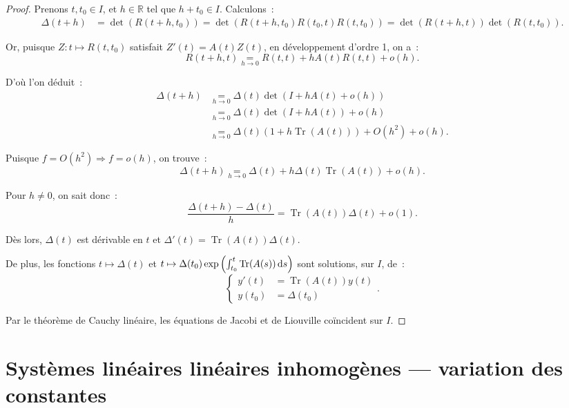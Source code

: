 \documentclass{report}
\theoremstyle{definition}
\theoremstyle{remark}
\numberwithin{equation}{section}
\newcommand{\R}{\mathbb R}
\DeclareMathOperator{\Tr}{Tr}
\begin{document}
		\begin{proof} Prenons $t, t_0 \in I$, et $h \in \R$ tel que $h + t_0 \in I$. Calculons~:
		\begin{align}
			\Delta(t+h) &= \det(R(t+h, t_0)) = \det(R(t+h, t_0)R(t_0, t)R(t, t_0)) = \det(R(t+h, t))\det(R(t, t_0)).
		\end{align}

		Or, puisque $Z : t \mapsto R(t, t_0)$ satisfait $Z'(t) = A(t)Z(t)$, en développement d'ordre 1, on a~:
		\begin{equation}
			R(t+h, t) \underset{h \to 0}= R(t, t) + hA(t)R(t, t) + o(h).
		\end{equation}

		D'où l'on déduit~:
		\begin{align}
			\Delta(t+h) &\underset{h \to 0}= \Delta(t)\det(I + hA(t) + o(h)) \\
			&\underset{h \to 0}= \Delta(t)\det(I + hA(t)) + o(h) \\
			&\underset{h \to 0}= \Delta(t)\left(1 + h\Tr(A(t))\right) + O(h^2) + o(h).
		\end{align}

		Puisque $f = O(h^2) \Rightarrow f = o(h)$, on trouve~:
		\begin{equation}
			\Delta(t+h) \underset{h \to 0}= \Delta(t) + h\Delta(t)\Tr(A(t)) + o(h).
		\end{equation}

		Pour $h \neq 0$, on sait donc~:
		\begin{equation}
			\frac {\Delta(t+h)-\Delta(t)}h = \Tr(A(t))\Delta(t) + o(1).
		\end{equation}

		Dès lors, $\Delta(t)$ est dérivable en $t$ et $\Delta'(t) = \Tr(A(t))\Delta(t)$.

		De plus, les fonctions $t \mapsto \Delta(t)$ et $t \mapsto \Delta(t_0)\exp\left(\int_{t_0}^t\Tr(A(s))\dif s\right)$ sont solutions, sur $I$, de~:
		\begin{equation}
			\begin{cases}y'(t) &= \Tr(A(t))y(t) \\y(t_0) &= \Delta(t_0)\end{cases}.
		\end{equation}

		Par le théorème de Cauchy linéaire, les équations de Jacobi et de Liouville coïncident sur $I$.
		\end{proof}

	\section{Systèmes linéaires linéaires inhomogènes --- variation des constantes}
\end{document}
